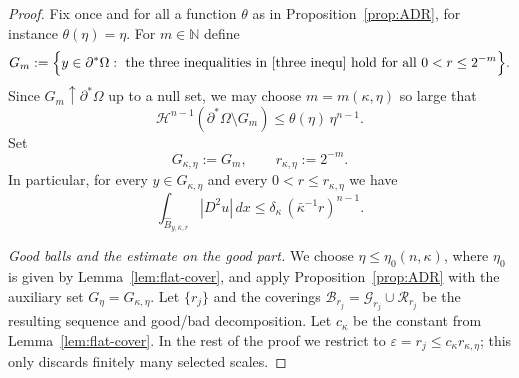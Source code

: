 \documentclass[10pt,a4paper]{amsart}
\begin{document}
\begin{proof}
{Fix once and for all a function $\theta$ as in Proposition~\ref{prop:ADR}, for instance $\theta(\eta)=\eta$.}
For $m\in\mathbb N$ define
\[
G_m:=\Bigl\{y\in\partial^*\Omega:\ \text{the three inequalities in \eqref{three inequ} hold for all }0<r\le 2^{-m}\Bigr\}.
\]
Since $G_m\uparrow \partial^*\Omega$ up to a null set, we may choose $m=m(\kappa,\eta)$ so large that
\[
\mathscr H^{n-1}(\partial^*\Omega\setminus G_m)\le \theta(\eta)\,\eta^{n-1}.
\]
Set
\[
G_{\kappa,\eta}:=G_m,\qquad r_{\kappa,\eta}:=2^{-m}.
\]
In particular, for every $y\in G_{\kappa,\eta}$ and every $0<r\le r_{\kappa,\eta}$ we have
\begin{equation}\label{7.1}
{
\int_{\widehat B_{y,\bar\kappa,r}}|D^2u|\,dx \le \delta_\kappa\,(\bar\kappa^{-1}r)^{n-1}.
}
\end{equation}

\smallskip
\noindent\emph{Good balls and the estimate on the good part.}
{We choose $\eta\le \eta_0(n,\kappa)$, where $\eta_0$ is given by Lemma~\ref{lem:flat-cover}, and apply
Proposition~\ref{prop:ADR} with the auxiliary set $G_\eta=G_{\kappa,\eta}$. Let $\{r_j\}$ and the coverings
$\mathcal B_{r_j}=\mathcal G_{r_j}\cup\mathcal R_{r_j}$ be the resulting sequence and good/bad decomposition.
Let $c_\kappa$ be the constant from Lemma~\ref{lem:flat-cover}. In the rest of the proof we restrict to
$\varepsilon=r_j\le c_\kappa r_{\kappa,\eta}$; this only discards finitely many selected scales.}


\end{proof}
\end{document}
